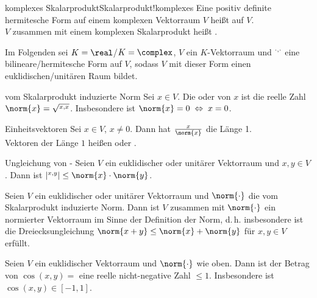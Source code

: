 \begin{xDef}{komplexes Skalarprodukt}{Skalarprodukt!komplexes}
    Eine positiv definite hermitesche Form auf einem komplexen Vektorraum $V$
    heißt 
    auf $V$. \\
    $V$ zusammen mit einem komplexen Skalarprodukt heißt
    .
\end{xDef}

\begin{Bem}
    Im Folgenden sei $K = \real$/$K= \complex$, $V$ ein $K$-Vektorraum
    und $\sp{\cdot, \cdot}$ eine bilineare/hermitesche Form auf $V$,
    sodass $V$ mit dieser Form einen euklidischen/unitären Raum bildet.
\end{Bem}

\begin{Def}{vom Skalarprodukt induzierte Norm}
    Sei $x \in V$.
    Die  oder  von $x$ ist die reelle Zahl
    $\norm{x} = \sqrt{\sp{x, x}}$.
    Insbesondere ist $\norm{x} = 0 \;\Leftrightarrow\; x = 0$.
\end{Def}

\begin{Def}{Einheitsvektoren}
    Sei $x \in V$, $x \not= 0$.
    Dann hat $\frac{x}{\norm{x}}$ die Länge 1. \\
    Vektoren der Länge $1$ heißen  oder
    .
\end{Def}

\begin{Satz}{Ungleichung von -}
    Seien $V$ ein euklidischer oder unitärer Vektorraum und $x, y \in V$.
    Dann ist $|\sp{x, y}| \le \norm{x} \cdot \norm{y}$.
\end{Satz}

\begin{Kor}
    Seien $V$ ein euklidischer oder unitärer Vektorraum und $\norm{\cdot}$
    die vom Skalarprodukt induzierte Norm.
    Dann ist $V$ zusammen mit $\norm{\cdot}$ ein normierter Vektorraum
    im Sinne der Definition der Norm, d.\,h. insbesondere ist
    die Dreiecksungleichung $\norm{x + y} \le \norm{x} + \norm{y}$ für
    $x, y \in V$ erfüllt.
\end{Kor}

\begin{Kor}
    Seien $V$ ein euklidischer Vektorraum und $\norm{\cdot}$ wie oben.
    Dann ist der Betrag von
    $\cos(x, y) =$ 
    eine reelle nicht-negative Zahl $\le 1$.
    Insbesondere ist $\cos(x, y) \in [-1, 1]$.
\end{Kor}

